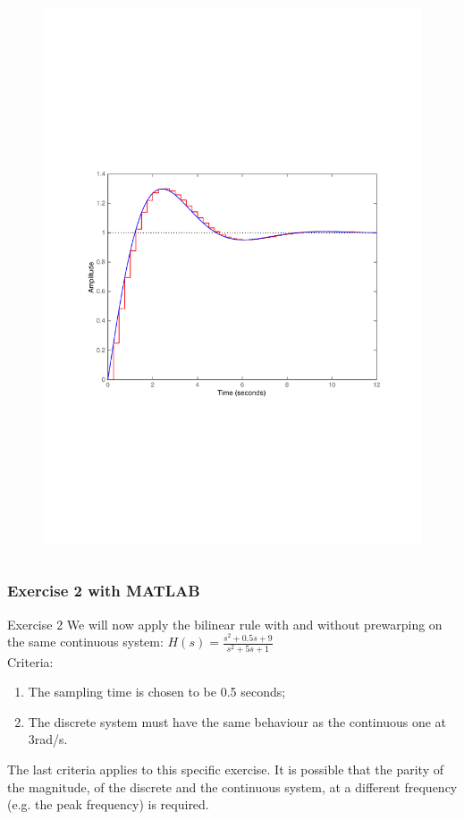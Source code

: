 \begin{frame}
\begin{columns}
\begin{column}{0.5\textwidth}
\begin{figure}
				\includegraphics[width=1\linewidth]{vb4}
			\end{figure}
		\end{column}
	\end{columns}
\end{frame}

\begin{frame}
	\frametitle{Exercise 2 with MATLAB}
	\begin{block}{Exercise 2}
		We will now apply the bilinear rule with and without prewarping on the same continuous system: $H(s) = \frac{s^{2} + 0.5s + 9}{s^{2} + 5s + 1}$\\
		\vspace{0.5em}
		Criteria: 
		\begin{enumerate}
			\item The sampling time is chosen to be 0.5 seconds;\\
			\item The discrete system must have the same behaviour as the continuous one at 3rad/s.
		\end{enumerate}
		\vspace{0.5em}
		The last criteria applies to this specific exercise. It is possible that the parity of the magnitude, of the discrete and the continuous system, at a different frequency (e.g. the peak frequency) is required.
	\end{block}	
\end{frame}
		
